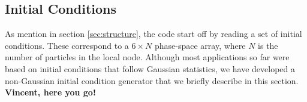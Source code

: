 \subsection{Initial Conditions}
\label{subsec:init}

As mention in section \ref{sec:structure}, the code start off by reading a set of initial conditions.
These correspond to a  $6 \times N$ phase-space array, where $N$ is the number of particles in the
local node. Although most applications so far were based on initial conditions that follow Gaussian statistics,
we have developed a non-Gaussian initial condition generator that we briefly describe in this section. 
{\bf Vincent, here you go!} 
